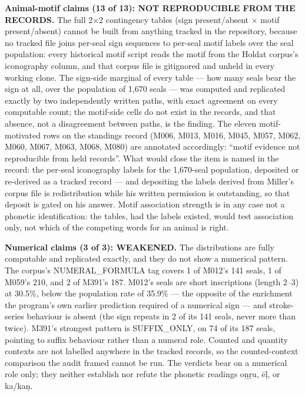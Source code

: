 \documentclass[11pt]{article}
\begin{document}
\textbf{Animal-motif claims (13 of 13): NOT REPRODUCIBLE FROM
THE RECORDS.} The full 2$\times$2 contingency tables (sign
present/absent $\times$ motif present/absent) cannot be built
from anything tracked in the repository, because no tracked file
joins per-seal sign sequences to per-seal motif labels over the
seal population: every historical motif script reads the motif
from the Holdat corpus's iconography column, and that corpus
file is gitignored and unheld in every working clone. The
sign-side marginal of every table --- how many seals bear the
sign at all, over the population of 1,670 seals --- was computed
and replicated exactly by two independently written paths, with
exact agreement on every computable count; the motif-side cells
do not exist in the records, and that absence, not a disagreement
between paths, is the finding. The eleven motif-motivated rows
on the standings record (M006, M013, M016, M045, M057, M062,
M060, M067, M063, M068, M080) are annotated accordingly: ``motif
evidence not reproducible from held records''. What would close
the item is named in the record: the per-seal iconography labels
for the 1,670-seal population, deposited or re-derived as a
tracked record --- and depositing the labels derived from
Miller's corpus file is redistribution while his written
permission is outstanding, so that deposit is gated on his
answer. Motif association strength is in any case not a phonetic
identification: the tables, had the labels existed, would test
association only, not which of the competing words for an animal
is right.

\textbf{Numerical claims (3 of 3): WEAKENED.} The distributions
are fully computable and replicated exactly, and they do not
show a numerical pattern. The corpus's NUMERAL\_FORMULA tag
covers 1 of M012's 141 seals, 1 of M059's 210, and 2 of M391's
187. M012's seals are short inscriptions (length 2--3) at 30.5\%,
below the population rate of 35.9\% --- the opposite of the
enrichment the program's own earlier prediction required of a
numerical sign --- and stroke-series behaviour is absent (the
sign repeats in 2 of its 141 seals, never more than twice).
M391's strongest pattern is SUFFIX\_ONLY, on 74 of its 187
seals, pointing to suffix behaviour rather than a numeral role.
Counted and quantity contexts are not labelled anywhere in the
tracked records, so the counted-context comparison the audit
framed cannot be run. The verdicts bear on a numerical role
only; they neither establish nor refute the phonetic readings
oṉṟu, ēḷ, or ka/kaṇ.
\end{document}
